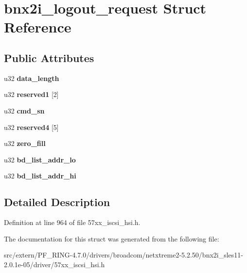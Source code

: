 \hypertarget{structbnx2i__logout__request}{
\section{bnx2i\_\-logout\_\-request Struct Reference}
\label{structbnx2i__logout__request}
}
\subsection*{Public Attributes}
\begin{DoxyCompactItemize}
\item 
\hypertarget{structbnx2i__logout__request_a0019dc4da4c993ed13f713022d83170b}{
u32 {\bfseries data\_\-length}}
\label{structbnx2i__logout__request_a0019dc4da4c993ed13f713022d83170b}

\item 
\hypertarget{structbnx2i__logout__request_af5b401c295c782c28e71c83af05b2acc}{
u32 {\bfseries reserved1} \mbox{[}2\mbox{]}}
\label{structbnx2i__logout__request_af5b401c295c782c28e71c83af05b2acc}

\item 
\hypertarget{structbnx2i__logout__request_a7d04eda19a0efddc2eda6316899c41f2}{
u32 {\bfseries cmd\_\-sn}}
\label{structbnx2i__logout__request_a7d04eda19a0efddc2eda6316899c41f2}

\item 
\hypertarget{structbnx2i__logout__request_ad7f3f351153baea71013a153626a2ead}{
u32 {\bfseries reserved4} \mbox{[}5\mbox{]}}
\label{structbnx2i__logout__request_ad7f3f351153baea71013a153626a2ead}

\item 
\hypertarget{structbnx2i__logout__request_adf45baea0e3b685c09f4d111e98a6483}{
u32 {\bfseries zero\_\-fill}}
\label{structbnx2i__logout__request_adf45baea0e3b685c09f4d111e98a6483}

\item 
\hypertarget{structbnx2i__logout__request_a33bb9489c8a5b111e94c66d7a86d77e3}{
u32 {\bfseries bd\_\-list\_\-addr\_\-lo}}
\label{structbnx2i__logout__request_a33bb9489c8a5b111e94c66d7a86d77e3}

\item 
\hypertarget{structbnx2i__logout__request_a841ff64eac3c57da8658406e32daedd2}{
u32 {\bfseries bd\_\-list\_\-addr\_\-hi}}
\label{structbnx2i__logout__request_a841ff64eac3c57da8658406e32daedd2}

\end{DoxyCompactItemize}


\subsection{Detailed Description}


Definition at line 964 of file 57xx\_\-iscsi\_\-hsi.h.



The documentation for this struct was generated from the following file:\begin{DoxyCompactItemize}
\item 
src/extern/PF\_\-RING-\/4.7.0/drivers/broadcom/netxtreme2-\/5.2.50/bnx2i\_\-sles11-\/2.0.1e-\/05/driver/57xx\_\-iscsi\_\-hsi.h\end{DoxyCompactItemize}
